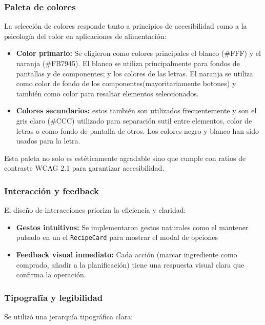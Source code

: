 \documentclass[twoside, openright, 11pt]{report}
\begin{document}
		\subsubsection*{Paleta de colores}
		La selección de colores responde tanto a principios de accesibilidad como a la psicología del color en aplicaciones de alimentación:
		
		\begin{itemize}
			\item \textbf{Color primario:} Se eligieron como colores principales el blanco (\#FFF) y el naranja (\#FB7945). El blanco se utiliza principalmente para fondos de pantallas y de componentes; y los colores de las letras. El naranja se utiliza como color de fondo de los componentes(mayoritariamente botones) y también como color para resaltar elementos seleccionados.
			
			\item \textbf{Colores secundarios:} estos también son utilizados frecuentemente y son el gris claro (\#CCC) utilizado para separación sutil entre elementos, color de letras o como fondo de pantalla de otros. Los colores negro y blanco han sido usados para la letra.
			
		\end{itemize}
		
		Esta paleta no solo es estéticamente agradable sino que cumple con ratios de contraste WCAG 2.1 para garantizar accesibilidad.
		
		\subsubsection*{Interacción y feedback}
		El diseño de interacciones prioriza la eficiencia y claridad:
		
		\begin{itemize}
			
			\item \textbf{Gestos intuitivos:} Se implementaron gestos naturales como el mantener pulsado en un el \texttt{RecipeCard} para mostrar el modal de opciones
			
			\item \textbf{Feedback visual inmediato:} Cada acción (marcar ingrediente como comprado, añadir a la planificación) tiene una respuesta visual clara que confirma la operación.
		\end{itemize}
		
		\subsubsection*{Tipografía y legibilidad}
		Se utilizó una jerarquía tipográfica clara:
		
\end{document}
